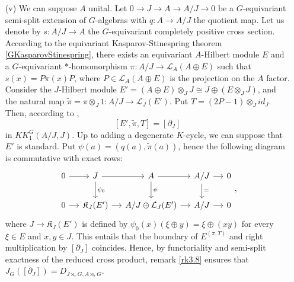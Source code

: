 \begin{dem}
\begin{enumerate}
\item[(v)] We can suppose $A$ unital. Let $0 \rightarrow J \rightarrow A \rightarrow A /J \rightarrow 0$ be a $G$-equivariant semi-split extension of $G$-algebras with $q:A\rightarrow A/J$ the quotient map. Let us denote by $s : A/J \rightarrow A $ the $G$-equivariant completely positive cross section.  According to the equivariant Kasparov-Stinespring theorem \ref{GKasparovStinespring}, there exists an equivariant $A$-Hilbert module $E$ and a $G$-equivariant $*$-homomorphism $\pi : A/J \rightarrow \mathcal L_{A}(A\oplus E)$ such that $s(x) = P \pi(x) P$, where $P \in \mathcal L_{A}(A\oplus E)$ is the projection on the $A$ factor. Consider the $J$-Hilbert module $E' = (A\oplus E)\otimes_J J \cong J\oplus (E\otimes_J J)$, and the natural map $\tilde\pi =\pi\otimes_J 1: A/ J \rightarrow \mathcal L_{J}(E')$. Put $T= (2P-1)\otimes_J id_J$. Then, according to \cite{SkandalisExtension}, 
\[[E', \tilde \pi , T] = [\partial_J]\]
in $KK_1^G(A/J,J)$. Up to adding a degenerate $K$-cycle, we can suppose that $E'$ is standard. Put $\psi ( a ) = (q(a), \tilde \pi (a))$, hence the following diagram is commutative with exact rows:
\[\begin{tikzcd}[column sep = small]
0\arrow{r} &J\arrow{r}\arrow{d}{\psi_0} & A \arrow{r}\arrow{d}{\psi}& A/J\arrow{r}\arrow{d}{=} & 0\\
0\arrow{r} & \mathfrak K_J(E')\arrow{r} & A/J \oplus \mathcal L_J (E') \arrow{r}& A/J\arrow{r} & 0
\end{tikzcd},\]
where $J \rightarrow  \mathfrak K_J(E') $ is defined by $\psi_0(x)(\xi\oplus y) = \xi\oplus (xy) $ for every $\xi\in E$ and $x,y\in J$. 
This entails that the boundary of $E^{(\pi,T)}$ and right multiplication by $[\partial_J]$ coincides. Hence, by functoriality and semi-split exactness of the reduced cross product, remark \ref{rk3.8} ensures that $J_G([\partial_J]) = D_{J\rtimes_r G,A\rtimes_r G}$.

\end{enumerate}
\end{dem}
